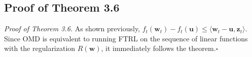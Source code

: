 \documentclass{article}
\newcommand*{\qed}{\null\nobreak\hfill\ensuremath{\square}}%
\begin{document}
\subsection{Proof of Theorem 3.6}
{\it Proof of Theorem 3.6.} As shown previously, $f_t(\textbf{w}_t)-f_t(\textbf{u})\leq \langle \textbf{w}_t-\textbf{u}, \textbf{z}_t\rangle$. Since OMD is equivalent to running FTRL on the sequence of linear functions with the regularization $R(\textbf{w})$, it immediately follows the theorem.\qed
\end{document}
